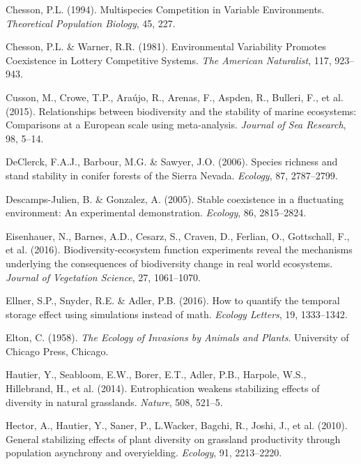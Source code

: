\documentclass[12pt,]{article}
\begin{document}
\hypertarget{ref-Chesson1994}{}
Chesson, P.L. (1994). Multispecies Competition in Variable Environments.
\emph{Theoretical Population Biology}, 45, 227.

\hypertarget{ref-Chesson1981a}{}
Chesson, P.L. \& Warner, R.R. (1981). Environmental Variability Promotes
Coexistence in Lottery Competitive Systems. \emph{The American
Naturalist}, 117, 923--943.

\hypertarget{ref-Cusson2015}{}
Cusson, M., Crowe, T.P., Araújo, R., Arenas, F., Aspden, R., Bulleri,
F., et al. (2015). Relationships between biodiversity and the stability
of marine ecosystems: Comparisons at a European scale using
meta-analysis. \emph{Journal of Sea Research}, 98, 5--14.

\hypertarget{ref-DeClerck2006}{}
DeClerck, F.A.J., Barbour, M.G. \& Sawyer, J.O. (2006). Species richness
and stand stability in conifer forests of the Sierra Nevada.
\emph{Ecology}, 87, 2787--2799.

\hypertarget{ref-Descamps-Julien2005}{}
Descamps-Julien, B. \& Gonzalez, A. (2005). Stable coexistence in a
fluctuating environment: An experimental demonstration. \emph{Ecology},
86, 2815--2824.

\hypertarget{ref-Eisenhauer2016}{}
Eisenhauer, N., Barnes, A.D., Cesarz, S., Craven, D., Ferlian, O.,
Gottschall, F., et al. (2016). Biodiversity-ecosystem function
experiments reveal the mechanisms underlying the consequences of
biodiversity change in real world ecosystems. \emph{Journal of
Vegetation Science}, 27, 1061--1070.

\hypertarget{ref-Ellner2016}{}
Ellner, S.P., Snyder, R.E. \& Adler, P.B. (2016). How to quantify the
temporal storage effect using simulations instead of math. \emph{Ecology
Letters}, 19, 1333--1342.

\hypertarget{ref-Elton1958}{}
Elton, C. (1958). \emph{The Ecology of Invasions by Animals and Plants}.
University of Chicago Press, Chicago.

\hypertarget{ref-Hautier2014}{}
Hautier, Y., Seabloom, E.W., Borer, E.T., Adler, P.B., Harpole, W.S.,
Hillebrand, H., et al. (2014). Eutrophication weakens stabilizing
effects of diversity in natural grasslands. \emph{Nature}, 508, 521--5.

\hypertarget{ref-Hector2010}{}
Hector, A., Hautier, Y., Saner, P., L.Wacker, Bagchi, R., Joshi, J., et
al. (2010). General stabilizing effects of plant diversity on grassland
productivity through population asynchrony and overyielding.
\emph{Ecology}, 91, 2213--2220.
\end{document}
